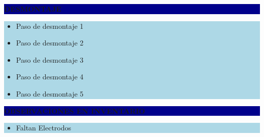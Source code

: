 \documentclass[11pt]{article}
\newcommand{\seccionbanda}[1]{%
  \vspace{0.6em}
  \noindent\colorbox{darkblue}{\parbox{\dimexpr\linewidth-2\fboxsep}{%
    \centering\color{white}\bfseries #1}}\par\vspace{0.6em}
}
\begin{document}
\seccionbanda{DESMONTAJE}
\noindent\colorbox{lightblue}{\parbox{\dimexpr\linewidth-2\fboxsep\relax}{%
\begin{itemize}[label=$\square$, itemsep=4pt]
\item Paso de desmontaje 1
\item Paso de desmontaje 2
\item Paso de desmontaje 3
\item Paso de desmontaje 4
\item Paso de desmontaje 5
\end{itemize}
}}\par
\seccionbanda{OBSERVACIONES EN INVENTARIO}
\noindent\colorbox{lightblue}{\parbox{\dimexpr\linewidth-2\fboxsep\relax}{\begin{itemize}[itemsep=4pt]
\item Faltan Electrodos
\end{itemize}}}\par
\end{document}

